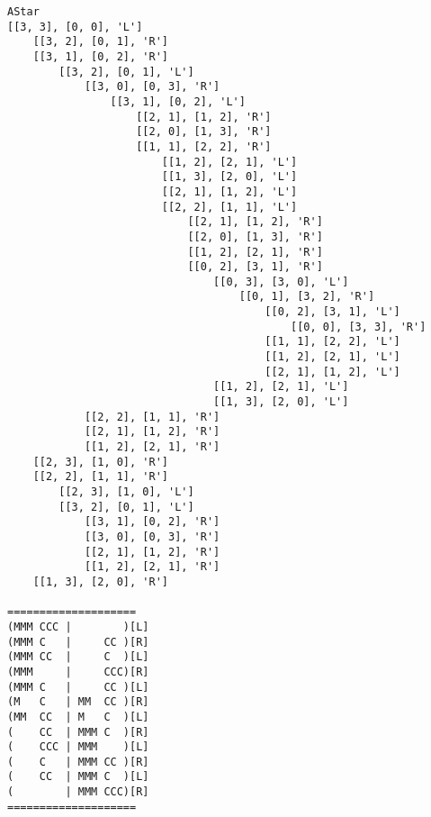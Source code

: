 \documentclass{article}
\begin{document}
\begin{verbatim}
AStar
[[3, 3], [0, 0], 'L']
    [[3, 2], [0, 1], 'R']
    [[3, 1], [0, 2], 'R']
        [[3, 2], [0, 1], 'L']
            [[3, 0], [0, 3], 'R']
                [[3, 1], [0, 2], 'L']
                    [[2, 1], [1, 2], 'R']
                    [[2, 0], [1, 3], 'R']
                    [[1, 1], [2, 2], 'R']
                        [[1, 2], [2, 1], 'L']
                        [[1, 3], [2, 0], 'L']
                        [[2, 1], [1, 2], 'L']
                        [[2, 2], [1, 1], 'L']
                            [[2, 1], [1, 2], 'R']
                            [[2, 0], [1, 3], 'R']
                            [[1, 2], [2, 1], 'R']
                            [[0, 2], [3, 1], 'R']
                                [[0, 3], [3, 0], 'L']
                                    [[0, 1], [3, 2], 'R']
                                        [[0, 2], [3, 1], 'L']
                                            [[0, 0], [3, 3], 'R']
                                        [[1, 1], [2, 2], 'L']
                                        [[1, 2], [2, 1], 'L']
                                        [[2, 1], [1, 2], 'L']
                                [[1, 2], [2, 1], 'L']
                                [[1, 3], [2, 0], 'L']
            [[2, 2], [1, 1], 'R']
            [[2, 1], [1, 2], 'R']
            [[1, 2], [2, 1], 'R']
    [[2, 3], [1, 0], 'R']
    [[2, 2], [1, 1], 'R']
        [[2, 3], [1, 0], 'L']
        [[3, 2], [0, 1], 'L']
            [[3, 1], [0, 2], 'R']
            [[3, 0], [0, 3], 'R']
            [[2, 1], [1, 2], 'R']
            [[1, 2], [2, 1], 'R']
    [[1, 3], [2, 0], 'R']

====================
(MMM CCC |        )[L]
(MMM C   |     CC )[R]
(MMM CC  |     C  )[L]
(MMM     |     CCC)[R]
(MMM C   |     CC )[L]
(M   C   | MM  CC )[R]
(MM  CC  | M   C  )[L]
(    CC  | MMM C  )[R]
(    CCC | MMM    )[L]
(    C   | MMM CC )[R]
(    CC  | MMM C  )[L]
(        | MMM CCC)[R]
====================
\end{verbatim}
\end{document}
